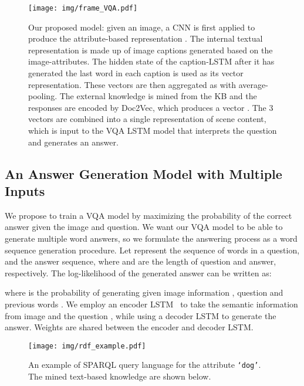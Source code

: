 \documentclass[10pt,journal,compsoc]{IEEEtran}
\begin{document}
\begin{figure*}[t!]
\begin{center}
\texttt{[image: img/frame\_VQA.pdf]}
\end{center}
\vspace{-10pt}
   \caption{Our proposed model: given an image, a CNN is first applied to produce the attribute-based representation \textcolor{red}{}. The internal textual representation is made up of image captions generated based on the image-attributes.
The hidden state of the caption-LSTM after it has generated the last word in each caption is used as its vector representation. These vectors are then aggregated as \textcolor{green}{} with average-pooling. The external knowledge is mined from the KB and the responses are encoded by Doc2Vec, which produces a vector \textcolor{blue}{}. The 3 vectors  are combined into a single representation of scene content, which is input to the VQA LSTM model that interprets the question and generates an answer.
   }
   \label{frame}
   \vspace{-10pt}
\end{figure*}


\vspace{-10pt}
\subsection{An Answer Generation Model with Multiple Inputs}
We propose to train a VQA model by maximizing the probability of the correct answer given the image and question. We want our VQA model to be able to generate multiple word answers, so we formulate the answering process as a word sequence generation procedure. Let  represent the sequence of words in a question, and  the answer sequence, where  and  are the length of question and answer, respectively. The log-likelihood of the generated answer can be written as: 

where  is the probability of generating  given image information , question  and previous words . We employ an encoder LSTM~\cite{hochreiter1997long} to take the semantic information from image  and the question , while using a decoder LSTM to generate the answer. Weights are shared between the encoder and decoder LSTM.

\begin{figure}[t]
  \centering
  \texttt{[image: img/rdf\_example.pdf]}
  \vspace{-3pt}
  \caption{An example of SPARQL query language for the attribute \texttt{`dog'}. The mined text-based knowledge are shown below.}
  \label{img:example_rdf}
  \vspace{-13pt}
\end{figure}
\end{document}

